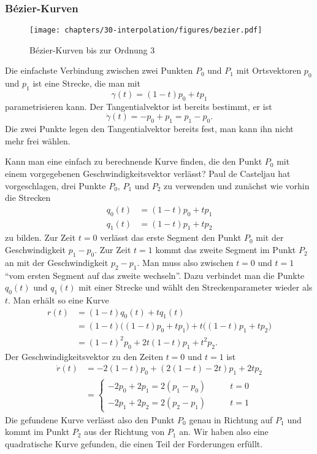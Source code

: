 %
%
\subsubsection{Bézier-Kurven}
\begin{figure}
\centering
\texttt{[image: chapters/30-interpolation/figures/bezier.pdf]}
\caption{Bézier-Kurven bis zur Ordnung 3
\label{buch:interpolation:figure:bezier}}
\end{figure}
Die einfachste Verbindung zwischen zwei Punkten $P_0$ und $P_1$ mit
Ortsvektoren $p_0$ und $p_1$ ist eine Strecke, die man mit
\[
\gamma(t) = (1-t)p_0 + tp_1
\]
parametrisieren kann.
Der Tangentialvektor ist bereits bestimmt, er ist
\[
\dot{\gamma}(t) = -p_0 + p_1 = p_1-p_0.
\]
Die zwei Punkte legen den Tangentialvektor bereits fest, man kann
ihn nicht mehr frei wählen.

Kann man eine einfach zu berechnende Kurve finden, die den Punkt $P_0$
mit einem vorgegebenen Geschwindigkeitsvektor verlässt?
Paul de Casteljau hat vorgeschlagen, drei Punkte $P_0$, $P_1$ und $P_2$
%
zu verwenden und zunächst wie vorhin die Strecken 
\begin{align*}
q_0(t) &= (1-t) p_0 + t p_1 \\
q_1(t) &= (1-t) p_1 + t p_2 
\end{align*}
zu bilden.
Zur Zeit $t=0$ verlässt das erste Segment den Punkt $P_0$ mit der
Geschwindigkeit $p_1-p_0$.
Zur Zeit $t=1$ kommt das zweite Segment im Punkt $P_2$ an mit der
Geschwindigkeit $p_2-p_1$.
Man muss also zwischen $t=0$ und $t=1$ ``vom ersten Segment auf das zweite
wechseln''.
Dazu verbindet man die Punkte $q_0(t)$ und $q_1(t)$ mit einer Strecke und
wählt den Streckenparameter wieder als $t$.
Man erhält so eine Kurve
\begin{align*}
r(t)
&=
(1-t) q_0(t) + t q_1(t)
\\
&=
(1-t) \bigl( (1-t)p_0 + tp_1\bigr)
+
t \bigl( (1-t)p_1 + tp_2\bigr)
\\
&=
(1-t)^2 p_0 + 2t(1-t) p_1 + t^2 p_2.
\end{align*}
Der Geschwindigkeitsvektor zu den Zeiten $t=0$ und $t=1$ ist
\begin{align*}
\dot{r}(t)
&=
-2(1-t)p_0 + (2(1-t)-2t) p_1 + 2tp_2
\\
&=\begin{cases}
-2p_0+2p_1=2(p_1-p_0)&\qquad t=0
\\
-2p_1+2p_2=2(p_2-p_1)&\qquad t=1
\end{cases}
\end{align*}
Die gefundene Kurve verlässt also den Punkt $P_0$ genau in Richtung
auf $P_1$ und kommt im Punkt $P_2$ aus der Richtung von $P_1$ an.
Wir haben also eine quadratische Kurve gefunden, die einen Teil 
der Forderungen erfüllt.

